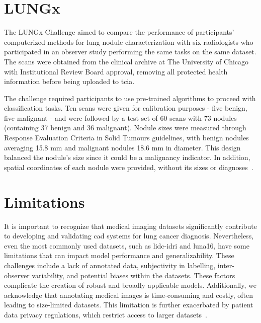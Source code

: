 \section{LUNGx}\label{lungx}
The LUNGx Challenge aimed to compare the performance of participants' computerized methods for lung nodule characterization with six radiologists who participated in an observer study performing the same tasks on the same dataset. The scans were obtained from the clinical archive at The University of Chicago with Institutional Review Board approval, removing all protected health information before being uploaded to \ac{tcia}. %

The challenge required participants to use pre-trained algorithms to proceed with classification tasks. Ten scans were given for calibration purposes - five benign, five malignant - and were followed by a test set of 60 scans with 73 nodules (containing 37 benign and 36 malignant). 
Nodule sizes were measured through Response Evaluation Criteria in Solid Tumours guidelines, with benign nodules averaging 15.8 mm and malignant nodules 18.6 mm in diameter. This design balanced the nodule's size since it could be a malignancy indicator. In addition, spatial coordinates of each nodule were provided, without its sizes or diagnoses~\cite{kirby_lungx_2016}.


\section{Limitations}

It is important to recognize that medical imaging datasets significantly contribute to developing and validating \ac{cad} systems for lung cancer diagnosis. Nevertheless, even the most commonly used datasets, such as \ac{lidc-idri} and \ac{luna16}, have some limitations that can impact model performance and generalizability. These challenges include a lack of annotated data, subjectivity in labelling, inter-observer variability, and potential biases within the datasets. These factors complicate the creation of robust and broadly applicable models. Additionally, we acknowledge that annotating medical images is time-consuming and costly, often leading to size-limited datasets. This limitation is further exacerbated by patient data privacy regulations, which restrict access to larger datasets~\cite{gu_survey_2021}.
   